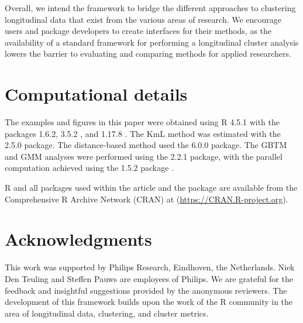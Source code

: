 Overall, we intend the framework to bridge the different approaches to clustering longitudinal data that exist from the various areas of research. We encourage users and package developers to create interfaces for their methods, as the availability of a standard framework for performing a longitudinal cluster analysis lowers the barrier to evaluating and comparing methods for applied researchers.

\section*{Computational details}\label{sec:technical}

The examples and figures in this paper were obtained using R 4.5.1 \citep{rcoreteam2021r} with the packages  1.6.2,  3.5.2 \citep{Wickham2016ggplot2}, and  1.17.8 \citep{Dowle2020data.table}. The KmL method was estimated with the  2.5.0 package. The distance-based method used the  6.0.0 package. The GBTM and GMM analyses were performed using the  2.2.1 package, with the parallel computation achieved using the  1.5.2 package \citep{weston2022foreach}.

R and all packages used within the article and the  package are available from the Comprehensive R Archive Network (CRAN) at (\url{https://CRAN.R-project.org}).

\section*{Acknowledgments}\label{acknowledgments}

This work was supported by Philips Research, Eindhoven, the Netherlands. Niek Den Teuling and Steffen Pauws are employees of Philips. We are grateful for the feedback and insightful suggestions provided by the anonymous reviewers. The development of this framework builds upon the work of the R community in the area of longitudinal data, clustering, and cluster metrics.



\address{%
Niek Den Teuling\\
Eindhoven University of Technology, and Philips Research\\%
\\
%
\url{https://github.com/niekdt}\\%
\textit{ORCiD: \href{https://orcid.org/0000-0003-1026-5080}{0000-0003-1026-5080}}\\%
\href{mailto:niek.den.teuling@philips.com}{\nolinkurl{niek.den.teuling@philips.com}}%
}

